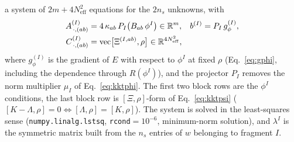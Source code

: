 \documentclass[11pt]{article}
\newcommand{\Neff}{N_{\mathrm{eff}}}
\begin{document}
a system of $2m+4\Neff^{2}$ equations for the $2n_s$ unknowns, with
\begin{align}
  A^{(I)}_{\,\cdot,(ab)}&=4\,\kappa_{ab}\,P_I\bigl(B_{ab}\,\phi^{I}\bigr)\in\mathbb R^{m},
  & b^{(I)}&=P_I\,g_\phi^{(I)},\notag\\
  C^{(I)}_{\,\cdot,(ab)}&=\mathrm{vec}\bigl[\Xi^{(I,ab)},\rho\bigr]\in\mathbb R^{4\Neff^{2}},
  \label{eq:linsysblocks}
\end{align}
where $g^{(I)}_\phi$ is the gradient of $E$ with respect to $\phi^I$ at fixed $\rho$
(Eq.~\eqref{eq:gphi}, including the dependence through $R(\phi^I)$), and the projector $P_I$ removes
the norm multiplier $\mu_I$ of Eq.~\eqref{eq:kktphi}. The first two block rows are the
$\phi^{I}$ conditions, the last block row is $[\Xi,\rho]$-form of Eq.~\eqref{eq:kktpsi}
($[K-\Lambda,\rho]=0\Leftrightarrow[\Lambda,\rho]=[K,\rho]$). The system is solved in the
least-squares sense (\texttt{numpy.linalg.lstsq}, \texttt{rcond}$=10^{-6}$, minimum-norm
solution), and $\lambda^I$ is the symmetric matrix built from the $n_s$ entries of $w$ belonging
to fragment $I$.
\end{document}
